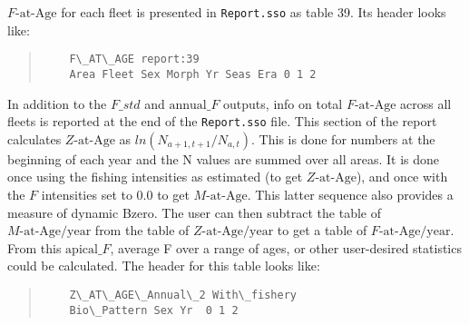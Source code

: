 

$F\text{-at-Age}$ for each fleet is presented in \texttt{Report.sso} as table 39. Its header looks like:
\begin{quote}
	\begin{verbatim}
	F\_AT\_AGE report:39
	Area Fleet Sex Morph Yr Seas Era 0 1 2
	\end{verbatim}
\end{quote}

In addition to the $F\_std$ and $\text{annual\_}F$ outputs, info on total $F\text{-at-Age}$ across all fleets is reported at the end of the \texttt{Report.sso} file. This section of the report calculates $Z\text{-at-Age}$ as $ln(N_{a+1,t+1}/N_{a,t})$. This is done for numbers at the beginning of each year and the N values are summed over all areas. It is done once using the fishing intensities as estimated (to get $Z\text{-at-Age}$), and once with the $F$ intensities set to 0.0 to get $M\text{-at-Age}$. This latter sequence also provides a measure of dynamic Bzero. The user can then subtract the table of $M\text{-at-Age/year}$ from the table of $Z\text{-at-Age/year}$ to get a table of $F\text{-at-Age/year}$. From this $\text{apical\_}F$, average F over a range of ages, or other user-desired statistics could be calculated. The header for this table looks like:
\begin{quote}
	\begin{verbatim}
	Z\_AT\_AGE\_Annual\_2 With\_fishery
	Bio\_Pattern Sex Yr  0 1 2
	\end{verbatim}
\end{quote}

